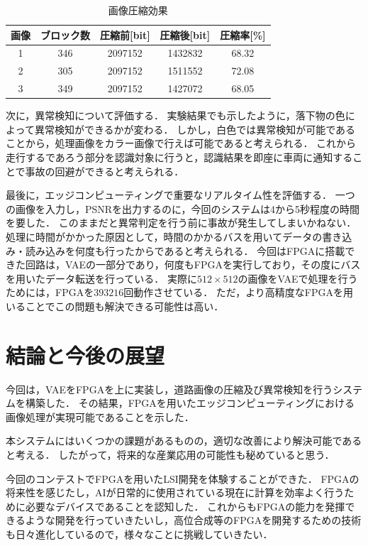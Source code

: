 \documentclass[paper]{ieicej}
\begin{document}
\begin{table}[tb]
  \centering
  \caption{画像圧縮効果}
  \small
  \begin{tabular}{|c|c|c|c|c|} \hline
    画像 & ブロック数 & 圧縮前[bit] & 圧縮後[bit] & 圧縮率[\%]\\ \hline
    1 & 346 & 2097152 & 1432832 & 68.32 \\ \hline
    2 & 305 & 2097152 & 1511552 & 72.08 \\ \hline
    3 & 349 & 2097152 & 1427072 & 68.05 \\ \hline
  \end{tabular}
  \label{tb:4}
\end{table}

次に，異常検知について評価する．
実験結果でも示したように，落下物の色によって異常検知ができるかが変わる．
しかし，白色では異常検知が可能であることから，処理画像をカラー画像で行えば可能であると考えられる．
これから走行するであろう部分を認識対象に行うと，認識結果を即座に車両に通知することで事故の回避ができると考えられる．

最後に，エッジコンピューティングで重要なリアルタイム性を評価する．
一つの画像を入力し，PSNRを出力するのに，今回のシステムは4から5秒程度の時間を要した．
このままだと異常判定を行う前に事故が発生してしまいかねない．
処理に時間がかかった原因として，時間のかかるバスを用いてデータの書き込み・読み込みを何度も行ったからであると考えられる．
今回はFPGAに搭載できた回路は，VAEの一部分であり，何度もFPGAを実行しており，その度にバスを用いたデータ転送を行っている．
実際に$512\times512$の画像をVAEで処理を行うためには，FPGAを$393216$回動作させている．
ただ，より高精度なFPGAを用いることでこの問題も解決できる可能性は高い．

\section{結論と今後の展望}
今回は，VAEをFPGAを上に実装し，道路画像の圧縮及び異常検知を行うシステムを構築した．
その結果，FPGAを用いたエッジコンピューティングにおける画像処理が実現可能であることを示した．

本システムにはいくつかの課題があるものの，適切な改善により解決可能であると考える．
したがって，将来的な産業応用の可能性も秘めていると思う．

今回のコンテストでFPGAを用いたLSI開発を体験することができた．
FPGAの将来性を感じたし，AIが日常的に使用されている現在に計算を効率よく行うために必要なデバイスであることを認知した．
これからもFPGAの能力を発揮できるような開発を行っていきたいし，高位合成等のFPGAを開発するための技術も日々進化しているので，様々なことに挑戦していきたい．
\end{document}
